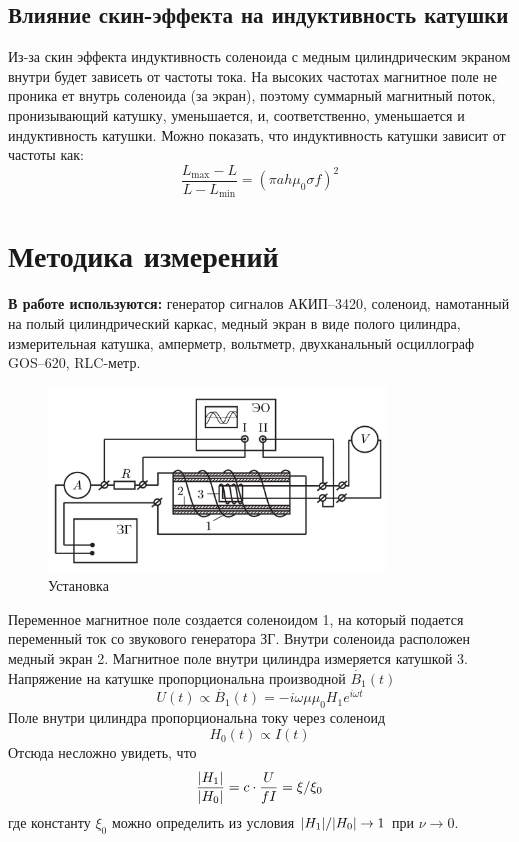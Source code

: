 \documentclass[12pt, a4paper]{article}
\begin{document}
\subsection*{Влияние скин-эффекта на индуктивность катушки}
Из-за скин эффекта индуктивность соленоида с медным цилиндрическим экраном
внутри будет зависеть от частоты тока. На высоких частотах магнитное поле не проника
ет внутрь соленоида (за экран), поэтому суммарный магнитный поток, пронизывающий
катушку, уменьшается, и, соответственно, уменьшается и индуктивность катушки. Можно показать,
что индуктивность катушки зависит от частоты как:
\begin{equation}
  \frac{L_\text{max} - L}{L - L_\text{min}} = (\pi ah \mu_0 \sigma f)^2
  \label{eq:ind_of_freq}
\end{equation}
\section{Методика измерений}
\textbf{В работе используются:} генератор сигналов АКИП–3420, соленоид,
намотанный на полый цилиндрический каркас, медный экран в виде полого цилиндра,
измерительная катушка, ам­перметр, вольтметр, двухканальный осциллограф GOS–620, RLC-метр.

\begin{figure}
  \centering
  \vspace{-8mm}
  \begin{center}
    \includegraphics[width=0.8\textwidth]{pics/setup}
  \end{center}
  \caption{Установка}\label{fig:ustanovka}
\end{figure}

Переменное магнитное поле создается соленоидом 1, на который подается переменный ток со звукового генератора ЗГ. Внутри соленоида расположен медный экран 2. Магнитное поле внутри цилиндра измеряется катушкой 3. Напряжение на катушке пропорциональна производной $\dot{B_1}(t)$
\begin{equation*}
  U(t) \propto \dot{B_1}(t) = -i\omega \mu \mu_0 H_1 e^{i\omega t}
\end{equation*}
Поле внутри цилиндра пропорциональна току через соленоид
\begin{equation*}
  H_0(t) \propto I(t)
\end{equation*}
Отсюда несложно увидеть, что
\begin{equation}
  \frac{\abs{H_1}}{\abs{H_0}} = c \cdot \frac{U}{f I} = \xi / \xi_0
  \label{eq:ampl_share}
\end{equation}
где константу  $\xi_0$ можно определить из условия $\abs{H_1}/\abs{H_0} \rightarrow 1$ при
$\nu \rightarrow 0$.\\
\end{document}
